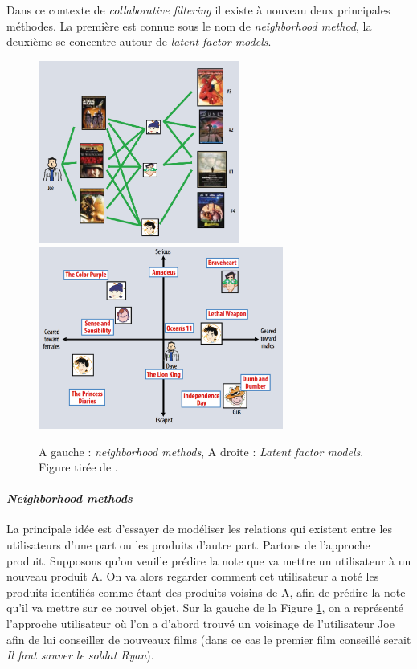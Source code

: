 \documentclass[10pt,a4paper]{article}
\begin{document}
Dans ce contexte de \textit{collaborative filtering} il existe à nouveau deux principales méthodes. La première est connue sous le nom de \textit{neighborhood method}, la deuxième se concentre autour de \textit{latent factor models}.

\begin{figure}[ht!]
\begin{center}
\includegraphics[height=6cm]{fig/neighboor_representation.png}
\includegraphics[height=6cm]{fig/factor_representation.png}
\caption{\label{nmet} A gauche : \textit{neighborhood methods}, A droite : \textit{Latent factor models}. Figure tirée de \cite{koren}.}
\end{center}
\end{figure}


\paragraph{\textit{Neighborhood methods}}

La principale idée est d'essayer de modéliser les relations qui existent entre les utilisateurs d'une part ou les produits d'autre part. Partons de l'approche produit. Supposons qu'on veuille prédire la note que va mettre un utilisateur à un nouveau produit A. On va alors regarder comment cet utilisateur a noté les produits identifiés comme étant des produits voisins de A, afin de prédire la note qu'il va mettre sur ce nouvel objet. Sur la gauche de la Figure \ref{nmet}, on a représenté l'approche utilisateur où l'on a d'abord trouvé un voisinage de l'utilisateur Joe afin de lui conseiller de nouveaux films (dans ce cas le premier film conseillé serait \textit{Il faut sauver le soldat Ryan}).
\end{document}
